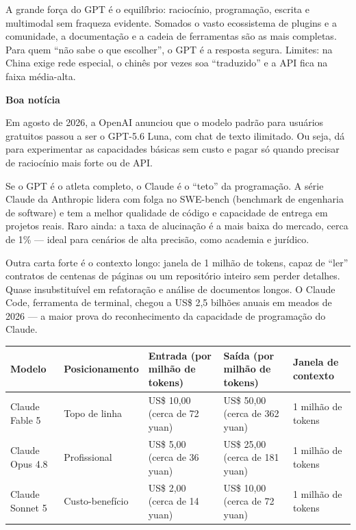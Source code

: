 A grande força do GPT é o equilíbrio: raciocínio, programação, escrita e multimodal sem fraqueza evidente. Somados o vasto ecossistema de plugins e a comunidade, a documentação e a cadeia de ferramentas são as mais completas. Para quem “não sabe o que escolher”, o GPT é a resposta segura. Limites: na China exige rede especial, o chinês por vezes soa “traduzido” e a API fica na faixa média-alta.

\textbf{Boa notícia}\par

Em agosto de 2026, a OpenAI anunciou que o modelo padrão para usuários gratuitos passou a ser o GPT-5.6 Luna, com chat de texto ilimitado. Ou seja, dá para experimentar as capacidades básicas sem custo e pagar só quando precisar de raciocínio mais forte ou de API.


Se o GPT é o atleta completo, o Claude é o “teto” da programação. A série Claude da Anthropic lidera com folga no SWE-bench (benchmark de engenharia de software) e tem a melhor qualidade de código e capacidade de entrega em projetos reais. Raro ainda: a taxa de alucinação é a mais baixa do mercado, cerca de 1\% — ideal para cenários de alta precisão, como academia e jurídico.

Outra carta forte é o contexto longo: janela de 1 milhão de tokens, capaz de “ler” contratos de centenas de páginas ou um repositório inteiro sem perder detalhes. Quase insubstituível em refatoração e análise de documentos longos. O Claude Code, ferramenta de terminal, chegou a US\$ 2,5 bilhões anuais em meados de 2026 — a maior prova do reconhecimento da capacidade de programação do Claude.

\begin{center}
\begin{tabularx}{\linewidth}{|X|X|X|X|X|}
\hline
\textbf{Modelo} & \textbf{Posicionamento} & \textbf{Entrada (por milhão de tokens)} & \textbf{Saída (por milhão de tokens)} & \textbf{Janela de contexto} \tabularnewline
\hline
Claude Fable 5 & Topo de linha & US\$ 10,00 (cerca de 72 yuan) & US\$ 50,00 (cerca de 362 yuan) & 1 milhão de tokens \tabularnewline
Claude Opus 4.8 & Profissional & US\$ 5,00 (cerca de 36 yuan) & US\$ 25,00 (cerca de 181 yuan) & 1 milhão de tokens \tabularnewline
Claude Sonnet 5 & Custo-benefício & US\$ 2,00 (cerca de 14 yuan) & US\$ 10,00 (cerca de 72 yuan) & 1 milhão de tokens \tabularnewline
\hline
\end{tabularx}
\end{center}

